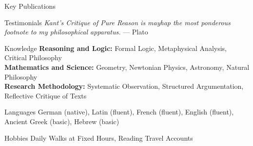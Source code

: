 \begin{hpxcv}
\begin{hpxmaincol}
    \begin{hpxmaincolsection}{Key Publications}
      \begin{dateentry}[
          from={1781},
          to={},
          title={Critique of Pure Reason},
          institution={},
        ]
        \kant[6][1]
      \end{dateentry}
      \begin{dateentry}[
          from={1788},
          to={},
          title={Critique of Practical Reason},
          institution={},
        ]
        \kant[6][2]
      \end{dateentry}
      \begin{dateentry}[
          from={1790},
          to={},
          title={Critique of the Power of Judgement},
          institution={},
        ]
        \kant[6][3]
      \end{dateentry}
    \end{hpxmaincolsection}
    \begin{hpxmaincolsection}{Testimonials}
      {\itshape
        Kant’s Critique of Pure Reason is mayhap the most ponderous footnote to my philosophical apparatus.%
      } \hfill--- Plato\\[1ex]
    \end{hpxmaincolsection}
  \end{hpxmaincol}
  \begin{hpxsidecol}
    \begin{sideentry}{Knowledge}
      \textbf{Reasoning and Logic:} Formal Logic, Metaphysical Analysis, Critical Philosophy\\[1ex]
      \textbf{Mathematics and Science:} Geometry, Newtonian Physics, Astronomy, Natural Philosophy\\[1ex]
      \textbf{Research Methodology:} Systematic Observation, Structured Argumentation, Reflective Critique of Texts\\[1ex]
    \end{sideentry}

    \begin{sideentry}{Languages}
      German (native), Latin (fluent), French (fluent), English (fluent), Ancient Greek (basic), Hebrew (basic)
    \end{sideentry}

    \begin{sideentry}{Hobbies}
      Daily Walks at Fixed Hours, Reading Travel Accounts
    \end{sideentry}
  \end{hpxsidecol}
\end{hpxcv}
